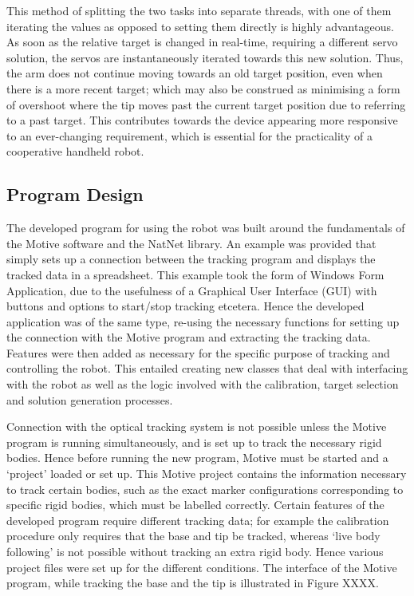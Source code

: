 \documentclass[11pt]{article}
\begin{document}
This method of splitting the two tasks into separate threads, with one of them iterating the values as opposed to setting them directly is highly advantageous. As soon as the relative target is changed in real-time, requiring a different servo solution, the servos are instantaneously iterated towards this new solution. Thus, the arm does not continue moving towards an old target position, even when there is a more recent target; which may also be construed as minimising a form of overshoot where the tip moves past the current target position due to referring to a past target. This contributes towards the device appearing more responsive to an ever-changing requirement, which is essential for the practicality of a cooperative handheld robot. 


\pagebreak
\subsection{Program Design}
\label{section:programDesign}

The developed program for using the robot was built around the fundamentals of the Motive software and the NatNet library. An example was provided that simply sets up a connection between the tracking program and displays the tracked data in a spreadsheet. This example took the form of Windows Form Application, due to the usefulness of a Graphical User Interface (GUI) with buttons and options to start/stop tracking etcetera. Hence the developed application was of the same type, re-using the necessary functions for setting up the connection with the Motive program and extracting the tracking data. Features were then added as necessary for the specific purpose of tracking and controlling the robot. This entailed creating new classes that deal with interfacing with the robot as well as the logic involved with the calibration, target selection and solution generation processes. 

Connection with the optical tracking system is not possible unless the Motive program is running simultaneously, and is set up to track the necessary rigid bodies. Hence before running the new program, Motive must be started and a `project' loaded or set up. This Motive project contains the information necessary to track certain bodies, such as the exact marker configurations corresponding to specific rigid bodies, which must be labelled correctly. Certain features of the developed program require different tracking data; for example the calibration procedure only requires that the base and tip be tracked, whereas `live body following' is not possible without tracking an extra rigid body. Hence various project files were set up for the different conditions. The interface of the Motive program, while tracking the base and the tip is illustrated in Figure XXXX.
\end{document}
